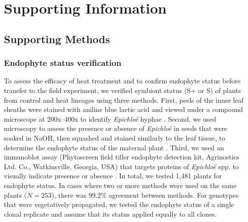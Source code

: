 \documentclass[12pt]{article}\usepackage[]{graphicx}\usepackage[dvipsnames]{xcolor}
\begin{document}
\appendix

\setcounter{figure}{0}
\setcounter{table}{0}
\setcounter{equation}{0}
\setcounter{section}{0}

\renewcommand{\thesection}{S.\arabic{section}}

\renewcommand{\theequation}{S\arabic{equation}}

\renewcommand{\figurename}{Fig}
\renewcommand{\thefigure}{S\arabic{figure}}

\renewcommand{\thetable}{S\arabic{table}}
\renewcommand{\tablename}{Table}

\section {Supporting Information}
\subsection {Supporting Methods}
\subsubsection {Endophyte status verification}
To assess the efficacy of heat treatment and to confirm endophyte status before transfer to the field experiment, we verified symbiont status (S+ or S\textminus) of plants from control and heat lineages using three methods. 
First, peels of the inner leaf sheaths were stained with aniline blue lactic acid and viewed under a compound microscope at 200x–400x to identify \emph{Epichloë} hyphae \citep{jackson1988rapid}. 
Second, we used microscopy to assess the presence or absence of \emph{Epichloë} in seeds that were soaked in NaOH, then squashed and stained similarly to the leaf tissue, to determine the endophyte status of the maternal plant \citep{fowler2025increasing}. 
Third, we used an immunoblot assay (Phytoscreen field tiller endophyte detection kit, Agrinostics Ltd. Co., Watkinsville, Georgia, USA) that targets proteins of \emph{Epichloë} spp. to visually indicate presence or absence \citep{koh2006rapid}. 
In total, we tested 1,481 plants for endophyte status. 
In cases where two or more methods were used on the same plants ($N=253$), there was 99.2\% agreement between methods.
For genotypes that were vegetatively propagated, we tested the endophyte status of a single clonal replicate and assume that its status applied equally to all clones. 
\end{document}
